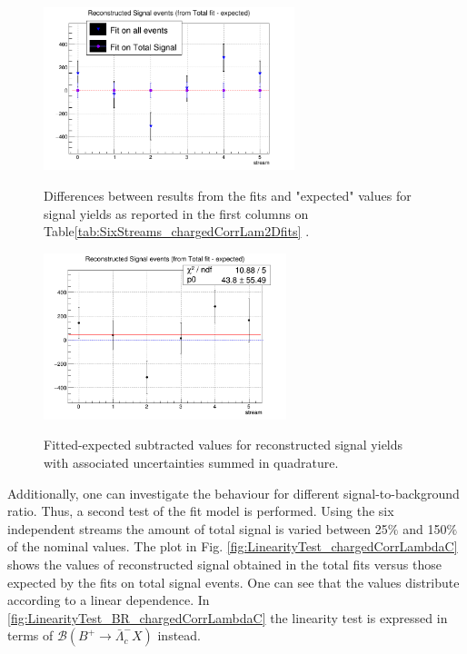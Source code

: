 \begin{figure}[H]
{\includegraphics[width=0.65\textwidth]{04-chargedCorrBtoLambda/figs/RecoSignal_fit_chargedCorrLambdaC_afterCrossfeedRatioParam.png}}
\caption{Differences between results from the fits and "expected" values for signal yields as reported in the first columns on Table\ref{tab:SixStreams_chargedCorrLam2Dfits} .}
\label{fig:RecoSignal_fit-expectedPlot}
\end{figure}

\begin{figure}[h]
{\includegraphics[width=0.63\textwidth]{04-chargedCorrBtoLambda/figs/RecoSignal_streams_fittedPoints_chargedCorrLambdaC_w_CrossfeedRatio_param.png}}
\caption{Fitted-expected subtracted values for reconstructed signal yields with associated uncertainties summed in quadrature.}
\label{fig:charged_corrLambdaRecoSignal_deviations}
\end{figure}


\noindent Additionally, one can investigate the behaviour for different signal-to-background ratio. Thus, a second test of the fit model is performed. 
Using the six independent streams the  amount of total signal is varied between 25$\%$ and 150$\%$ of the nominal values.%
\noindent  The plot in Fig. \ref{fig:LinearityTest_chargedCorrLambdaC} shows the values of reconstructed signal obtained in the total fits versus those expected by the fits on total signal events. 
One can see that the values distribute according to a linear dependence. In \cref{fig:LinearityTest_BR_chargedCorrLambdaC} the linearity test is expressed in terms of $\mathcal{B}(B^+ \rightarrow \bar{\Lambda}_c^- X)$ instead. %

